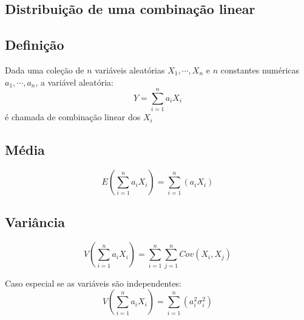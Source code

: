 \begin{tcolorbox}[sharp corners, colback=white,boxrule=1mm]
\section{Distribuição de uma combinação linear}
\subsection{Definição}
Dada uma coleção de $n$ variáveis aleatórias \(X_1, \cdots, X_n\) e $n$ constantes numéricas $a_1, \cdots, a_n$, a variável aleatória:
\[Y = \sum_{i=1}^{n} a_iX_i\]
é chamada de combinação linear dos $X_i$
\subsection{Média}
\[E\left ( \sum_{i=1}^n a_iX_i \right ) = \sum_{i=1}^n \left ( a_iX_i \right )\]

\subsection{Variância}
\[V\left ( \sum_{i=1}^n a_iX_i \right ) = \sum_{i=1}^n\sum_{j=1}^n \displaystyle{Cov}(X_i, X_j)\]

Caso especial se as variáveis são independentes:
\[V\left ( \sum_{i=1}^n a_iX_i \right ) = \sum_{i=1}^n \left ( a^2_i \sigma_i^2 \right )\]
\end{tcolorbox}